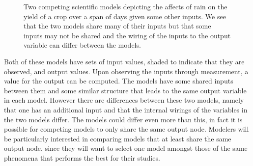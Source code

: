 \begin{figure}[!htbp]
  \label{fig:simple_crop_CAG}
  \centering
  \caption[Competing Models of Crop Yield]{Two competing scientific models depicting the affects of rain on the yield of a crop over a span of days given some other inputs. We see that the two models share many of their inputs but that some inputs may not be shared and the wiring of the inputs to the output variable can differ between the models.}
\end{figure}

Both of these models have sets of input values, shaded to indicate
that they are observed, and output values. Upon observing the inputs through measurement, a value for the output can be computed.
The models have some shared inputs between them and some similar structure that leads to the same output variable in each model.
However there are differences between these two models, namely that one has an additional input and that the internal wirings of the variables in the two models differ.
The models could differ even more than this, in fact it is possible for competing models to only share the same output node.
Modelers will be particularly interested in comparing models that at least share the same output node, since they will want to select one model amongst those of the same phenomena that performs the best for their studies.

